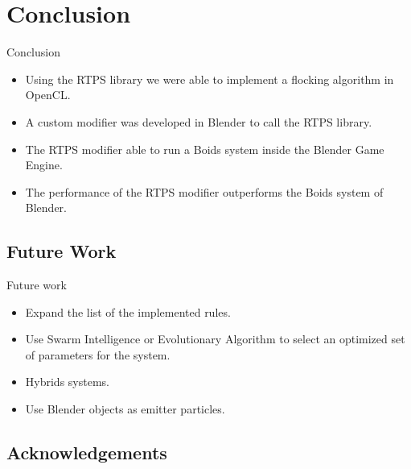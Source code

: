 \documentclass[red]{beamer}
\begin{document}
\section{Conclusion}
\begin{frame}{Conclusion}
	\begin{itemize}
		\item Using the RTPS library we were able to implement a flocking algorithm in OpenCL.
		\item A custom modifier was developed in Blender to call the RTPS library.
		\item The RTPS modifier able to run a Boids system inside the Blender Game Engine.
		\item The performance of the RTPS modifier outperforms the Boids system of Blender.
	\end{itemize}
\end{frame}

\subsection{Future Work}
\begin{frame}{Future work}
	\begin{itemize}
		\item Expand the list of the implemented rules.
		\item Use Swarm Intelligence or Evolutionary Algorithm to select an optimized set of parameters for the system.
		\item Hybrids systems.
		\item Use Blender objects as emitter particles.
	\end{itemize}
\end{frame}

\subsection{Acknowledgements}
\end{document}
